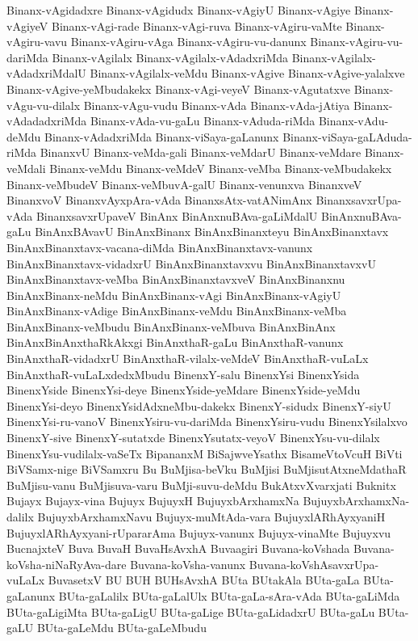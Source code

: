 {Binanx-vAgidadxre
Binanx-vAgidudx
Binanx-vAgiyU
Binanx-vAgiye
Binanx-vAgiyeV
Binanx-vAgi-rade
Binanx-vAgi-ruva
Binanx-vAgiru-vaMte
Binanx-vAgiru-vavu
Binanx-vAgiru-vAga
Binanx-vAgiru-vu-danunx
Binanx-vAgiru-vu-dariMda
Binanx-vAgilalx
Binanx-vAgilalx-vAdadxriMda
Binanx-vAgilalx-vAdadxriMdalU
Binanx-vAgilalx-veMdu
Binanx-vAgive
Binanx-vAgive-yalalxve
Binanx-vAgive-yeMbudakekx
Binanx-vAgi-veyeV
Binanx-vAgutatxve
Binanx-vAgu-vu-dilalx
Binanx-vAgu-vudu
Binanx-vAda
Binanx-vAda-jAtiya
Binanx-vAdadadxriMda
Binanx-vAda-vu-gaLu
Binanx-vAduda-riMda
Binanx-vAdu-deMdu
Binanx-vAdadxriMda
Binanx-viSaya-gaLanunx
Binanx-viSaya-gaLAduda-riMda
BinanxvU
Binanx-veMda-gali
Binanx-veMdarU
Binanx-veMdare
Binanx-veMdali
Binanx-veMdu
Binanx-veMdeV
Binanx-veMba
Binanx-veMbudakekx
Binanx-veMbudeV
Binanx-veMbuvA-galU
Binanx-venunxva
BinanxveV
BinanxvoV
BinanxvAyxpAra-vAda
BinanxsAtx-vatANimAnx
BinanxsavxrUpa-vAda
BinanxsavxrUpaveV
BinAnx
BinAnxnuBAva-gaLiMdalU
BinAnxnuBAva-gaLu
BinAnxBAvavU
BinAnxBinanx
BinAnxBinanxteyu
BinAnxBinanxtavx
BinAnxBinanxtavx-vacana-diMda
BinAnxBinanxtavx-vanunx
BinAnxBinanxtavx-vidadxrU
BinAnxBinanxtavxvu
BinAnxBinanxtavxvU
BinAnxBinanxtavx-veMba
BinAnxBinanxtavxveV
BinAnxBinanxnu
BinAnxBinanx-neMdu
BinAnxBinanx-vAgi
BinAnxBinanx-vAgiyU
BinAnxBinanx-vAdige
BinAnxBinanx-veMdu
BinAnxBinanx-veMba
BinAnxBinanx-veMbudu
BinAnxBinanx-veMbuva
BinAnxBinAnx
BinAnxBinAnxthaRkAkxgi
BinAnxthaR-gaLu
BinAnxthaR-vanunx
BinAnxthaR-vidadxrU
BinAnxthaR-vilalx-veMdeV
BinAnxthaR-vuLaLx
BinAnxthaR-vuLaLxdedxMbudu
BinenxY-salu
BinenxYsi
BinenxYsida
BinenxYside
BinenxYsi-deye
BinenxYside-yeMdare
BinenxYside-yeMdu
BinenxYsi-deyo
BinenxYsidAdxneMbu-dakekx
BinenxY-sidudx
BinenxY-siyU
BinenxYsi-ru-vanoV
BinenxYsiru-vu-dariMda
BinenxYsiru-vudu
BinenxYsilalxvo
BinenxY-sive
BinenxY-sutatxde
BinenxYsutatx-veyoV
BinenxYsu-vu-dilalx
BinenxYsu-vudilalx-vaSeTx
BipananxM
BiSajwveYsathx
BisameVtoVcuH
BiVti
BiVSamx-nige
BiVSamxru
Bu
BuMjisa-beVku
BuMjisi
BuMjisutAtxneMdathaR
BuMjisu-vanu
BuMjisuva-varu
BuMji-suvu-deMdu
BukAtxvXvarxjati
Buknitx
Bujayx
Bujayx-vina
Bujuyx
BujuyxH
BujuyxbArxhamxNa
BujuyxbArxhamxNa-dalilx
BujuyxbArxhamxNavu
Bujuyx-muMtAda-vara
BujuyxlARhAyxyaniH
BujuyxlARhAyxyani-rUpararAma
Bujuyx-vanunx
Bujuyx-vinaMte
Bujuyxvu
BucnajxteV
Buva
BuvaH
BuvaHsAvxhA
Buvaagiri
Buvana-koVshada
Buvana-koVsha-niNaRyAva-dare
Buvana-koVsha-vanunx
Buvana-koVshAsavxrUpa-vuLaLx
BuvasetxV
BU
BUH
BUHsAvxhA
BUta
BUtakAla
BUta-gaLa
BUta-gaLanunx
BUta-gaLalilx
BUta-gaLalUlx
BUta-gaLa-sAra-vAda
BUta-gaLiMda
BUta-gaLigiMta
BUta-gaLigU
BUta-gaLige
BUta-gaLidadxrU
BUta-gaLu
BUta-gaLU
BUta-gaLeMdu
BUta-gaLeMbudu
}
